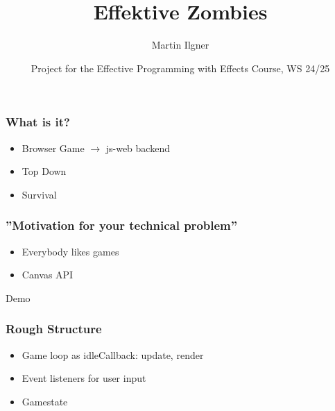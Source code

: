 \documentclass{beamer}
\title{Effektive Zombies}
\author{Martin Ilgner}
\institute{University of Tübingen}
\date{Project for the Effective Programming with Effects Course, WS 24/25}
\begin{document}
	
	
	
	\frame{\titlepage}
	
	\begin{frame}
		\frametitle{What is it?}
		\begin{Large}
		\begin{itemize}
			\setlength{\itemsep}{.5em}
			\item Browser Game $\rightarrow$ js-web backend
			\item Top Down 
			\item Survival
		\end{itemize}
		\end{Large}
	\end{frame}
	
	\begin{frame}
		\frametitle{''Motivation for your technical problem''}
		\begin{Large}
		\begin{itemize}
			\setlength{\itemsep}{1em}
			\item Everybody likes games
			\item Canvas API
		\end{itemize}
		\end{Large}
	\end{frame}
	
	\begin{frame}[plain, c]
		\begin{center}
			\Huge Demo
		\end{center}
	\end{frame}
	
	\begin{frame}
		\frametitle{Rough Structure}
		\begin{Large}
		\begin{itemize}
			\setlength{\itemsep}{.5em}
			\item Game loop as idleCallback: update, render
			\item Event listeners for user input
			\item Gamestate
		\end{itemize}
		\end{Large}
	\end{frame}
	
\end{document}

